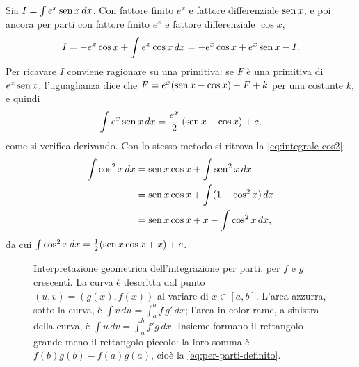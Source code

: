 \begin{esempio}\label{es:per-parti-ciclico}
Sia $I=\int e^{x}\operatorname{sen} x\,dx$. Con fattore finito $e^{x}$ e fattore differenziale $\operatorname{sen} x$,
e poi ancora per parti con fattore finito $e^{x}$ e fattore differenziale $\cos x$,
\[
  I=-e^{x}\cos x+\int e^{x}\cos x\,dx=-e^{x}\cos x+e^{x}\operatorname{sen} x-I .
\]
Per ricavare $I$ conviene ragionare su una primitiva: se $F$ è una primitiva di
$e^{x}\operatorname{sen} x$, l'uguaglianza dice che $F=e^{x}(\operatorname{sen} x-\cos x)-F+k$ per una costante $k$, e
quindi
\begin{equation}\label{eq:integrale-exp-sen}
  \int e^{x}\operatorname{sen} x\,dx=\frac{e^{x}}2\,(\operatorname{sen} x-\cos x)+c ,
\end{equation}
come si verifica derivando. Con lo stesso metodo si ritrova la \eqref{eq:integrale-cos2}:
\[
\begin{aligned}
  \int\cos^{2}x\,dx&=\operatorname{sen} x\cos x+\int\operatorname{sen}^{2}x\,dx\\
  &=\operatorname{sen} x\cos x+\int(1-\cos^{2}x)\,dx\\
  &=\operatorname{sen} x\cos x+x-\int\cos^{2}x\,dx ,
\end{aligned}
\]
da cui $\int\cos^{2}x\,dx=\frac12(\operatorname{sen} x\cos x+x)+c$.
\end{esempio}

\begin{figure}[htb]
\centering
{}
\caption{Interpretazione geometrica dell'integrazione per parti, per $f$ e $g$ crescenti.
La curva è descritta dal punto $(u,v)=(g(x),f(x))$ al variare di $x\in[a,b]$. L'area
azzurra, sotto la curva, è $\int v\,du=\int_{a}^{b}f\,g'\,dx$; l'area in color rame, a sinistra
della curva, è $\int u\,dv=\int_{a}^{b}f'g\,dx$. Insieme formano il rettangolo grande meno il
rettangolo piccolo: la loro somma è $f(b)g(b)-f(a)g(a)$, cioè la
\eqref{eq:per-parti-definito}.}
\label{fig:per-parti}
\end{figure}

